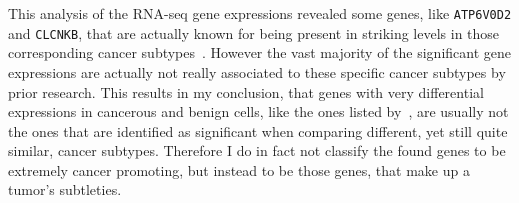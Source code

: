 This analysis of the RNA-seq gene expressions revealed some genes, like \texttt{ATP6V0D2} and \texttt{CLCNKB}, that are actually known for being present in striking levels
in those corresponding cancer subtypes~\citep{zhou}.
However the vast majority of the significant gene expressions are actually not really associated to these specific cancer subtypes by prior research.
This results in my conclusion, that genes with very differential expressions in cancerous and benign cells, like the ones listed by~\cite{tcga13},
are usually not the ones that are identified as significant when comparing different, yet still quite similar, cancer subtypes.
Therefore I do in fact not classify the found genes to be extremely cancer promoting, but instead
to be those genes, that make up a tumor's subtleties.